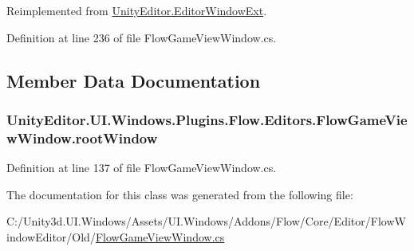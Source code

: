 Reimplemented from \hyperlink{class_unity_editor_1_1_editor_window_ext_aaa95c1215e9d733e51018f7bc545da1b}{Unity\+Editor.\+Editor\+Window\+Ext}.



Definition at line 236 of file Flow\+Game\+View\+Window.\+cs.



\subsection{Member Data Documentation}
\hypertarget{class_unity_editor_1_1_u_i_1_1_windows_1_1_plugins_1_1_flow_1_1_editors_1_1_flow_game_view_window_aeb9ebc878281a072dcd90d2edd25da91}{}
\subsubsection[{root\+Window}]{ Unity\+Editor.\+U\+I.\+Windows.\+Plugins.\+Flow.\+Editors.\+Flow\+Game\+View\+Window.\+root\+Window}\label{class_unity_editor_1_1_u_i_1_1_windows_1_1_plugins_1_1_flow_1_1_editors_1_1_flow_game_view_window_aeb9ebc878281a072dcd90d2edd25da91}


Definition at line 137 of file Flow\+Game\+View\+Window.\+cs.



The documentation for this class was generated from the following file\+:\begin{DoxyCompactItemize}
\item 
C\+:/\+Unity3d.\+U\+I.\+Windows/\+Assets/\+U\+I.\+Windows/\+Addons/\+Flow/\+Core/\+Editor/\+Flow\+Window\+Editor/\+Old/\hyperlink{_flow_game_view_window_8cs}{Flow\+Game\+View\+Window.\+cs}\end{DoxyCompactItemize}
